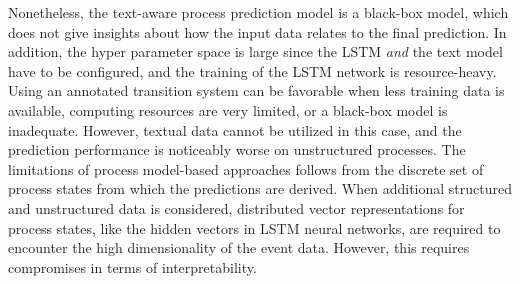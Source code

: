 Nonetheless, the text-aware process prediction model is a black-box model, which does not give insights about how the input data relates to the final prediction.
In addition, the hyper parameter space is large since the LSTM \textit{and} the text model have to be configured, and the training of the LSTM network is resource-heavy.
Using an annotated transition system can be favorable when less training data is available, computing resources are very limited, or a black-box model is inadequate.
However, textual data cannot be utilized in this case, and the prediction performance is noticeably worse on unstructured processes.
The limitations of process model-based approaches follows from the discrete set of process states from which the predictions are derived.
When additional structured and unstructured data is considered, distributed vector representations for process states, like the hidden vectors in LSTM neural networks, are required to encounter the high dimensionality of the event data.
However, this requires compromises in terms of interpretability.